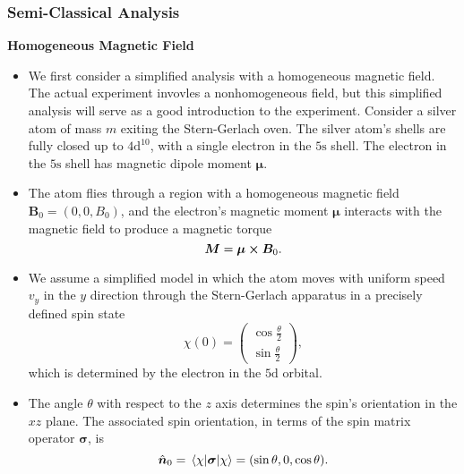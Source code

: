 \documentclass[11pt, a4paper]{article}
\renewcommand{\vec}[1]{\bm{#1}}  %
\newcommand{\uvec}[1]{\hat{\vec{#1}}}  %
\newcommand{\B}{\vec{B}}  %
\newcommand{\m}{\vec{\mu}}  %
\begin{document}
\subsubsection{Semi-Classical Analysis} \label{sss:sg-semi-classical}
\textbf{Homogeneous Magnetic Field}
\begin{itemize}

    \item We first consider a simplified analysis with a homogeneous magnetic field. The actual experiment invovles a nonhomogeneous field, but this simplified analysis will serve as a good introduction to the experiment. 
    Consider a silver atom of mass $ m $ exiting the Stern-Gerlach oven. The silver atom's shells are fully closed up to $ 4 \mathrm{d}^{10} $, with a single electron in the $ 5 \mathrm{s} $ shell. The electron in the $ 5 \mathrm{s} $ shell has magnetic dipole moment $ \m $.

    \item The atom flies through a region with a homogeneous magnetic field $ \B_{0} = (0, 0, B_{0}) $, and the electron's magnetic moment $ \m $ interacts with the magnetic field to produce a magnetic torque
    \begin{equation*}
        \vec{M} = \m \cross \B_{0}.
    \end{equation*}

    \item We assume a simplified model in which the atom moves with uniform speed $ v_{y} $ in the $ y $ direction through the Stern-Gerlach apparatus in a precisely defined spin state
    \begin{equation*}
        \chi(0) = 
        \begin{pmatrix}
            \cos \frac{\theta}{2}\\[1mm]
            \sin \frac{\theta}{2}
        \end{pmatrix},
    \end{equation*}
    which is determined by the electron in the $ 5 \mathrm{d} $ orbital.

    \item The angle $ \theta $ with respect to the $ z $ axis determines the spin's orientation in the $ xz $ plane. The associated spin orientation, in terms of the spin matrix operator $ \vec{\sigma} $, is
    \begin{equation*}
        \uvec{n}_{0} = \mel{\chi}{\vec{\sigma}}{\chi} = (\sin \theta, 0, \cos \theta).
    \end{equation*}


\end{itemize}
\end{document}
